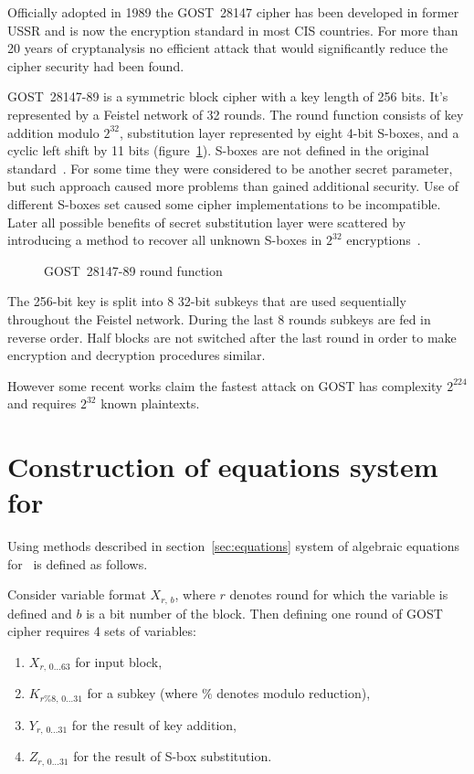 Officially adopted in 1989 the GOST~28147 cipher has been developed in
former USSR and is now the encryption standard in most CIS countries.
For more than 20 years of cryptanalysis no efficient attack that would
significantly reduce the cipher security had been found.

GOST~28147-89 is a symmetric block cipher with a key length of 256 bits. It's
represented by a Feistel network of 32 rounds. The round function consists of
key addition modulo $2^{32}$, substitution layer represented by eight 4-bit
S-boxes, and a cyclic left shift by 11 bits (figure~\ref{fig:gost-round-func}).
S-boxes are not defined in the
original standard~\cite{GOST28147}. For some time they were considered to be
another secret parameter, but such approach caused more problems than gained
additional security. Use of different S-boxes set caused some cipher
implementations to be incompatible. Later all possible benefits of secret
substitution layer were scattered by introducing a method to recover all
unknown S-boxes in $2^{32}$ encryptions~\cite{saarinen1998:sboxes}.
\begin{figure}[htbp]
    \centering
    
    \caption{GOST~28147-89 round function}
    \label{fig:gost-round-func}
\end{figure}
The 256-bit key is split into 8 32-bit subkeys that are used sequentially
throughout the Feistel network. During the last 8 rounds subkeys are fed in
reverse order. Half blocks are not switched after the last round in order to
make encryption and decryption procedures similar.

However some recent works
\cite{cryptoeprint-2011-626, Courtois:cryptoeprint_2011} claim the fastest attack on
GOST has complexity $2^{224}$ and requires $2^{32}$ known plaintexts.

\section{Construction of equations system for \gost}

Using methods described in section~\ref{sec:equations} system of algebraic
equations for \gost\ is defined as follows.

Consider variable format $X_{r, \, b}$, where $r$ denotes round for which the
variable is defined and $b$ is a bit number of the block. Then defining one
round of GOST cipher requires 4 sets of variables:
\begin{enumerate}
    \item $X_{r, \, 0 \hdots 63}$ for input block,
    \item $K_{r \% 8, \, 0 \hdots 31}$ for a subkey (where $\%$
        denotes modulo reduction),
    \item $Y_{r, \, 0 \hdots 31}$ for the result of key addition,
    \item $Z_{r, \, 0 \hdots 31}$ for the result of S-box substitution.
\end{enumerate}

